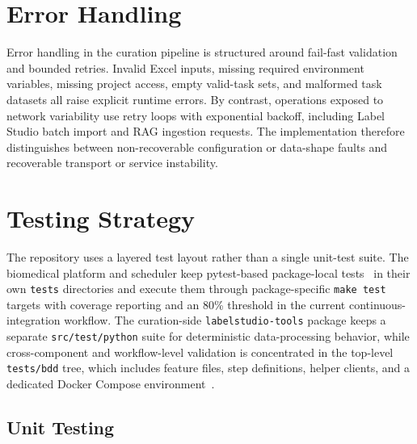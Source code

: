 \section{Error Handling}

Error handling in the curation pipeline is structured around fail-fast validation and bounded retries. Invalid Excel inputs, missing required environment variables, missing project access, empty valid-task sets, and malformed task datasets all raise explicit runtime errors. By contrast, operations exposed to network variability use retry loops with exponential backoff, including Label Studio batch import and RAG ingestion requests. The implementation therefore distinguishes between non-recoverable configuration or data-shape faults and recoverable transport or service instability.

\section{Testing Strategy}

The repository uses a layered test layout rather than a single unit-test suite. The biomedical platform and scheduler keep pytest-based package-local tests~\cite{pytest2026docs} in their own \texttt{tests} directories and execute them through package-specific \texttt{make test} targets with coverage reporting and an 80\% threshold in the current continuous-integration workflow. The curation-side \texttt{labelstudio-tools} package keeps a separate \texttt{src/test/python} suite for deterministic data-processing behavior, while cross-component and workflow-level validation is concentrated in the top-level \texttt{tests/bdd} tree, which includes feature files, step definitions, helper clients, and a dedicated Docker Compose environment~\cite{dockercompose2026docs}.

\subsection{Unit Testing}

